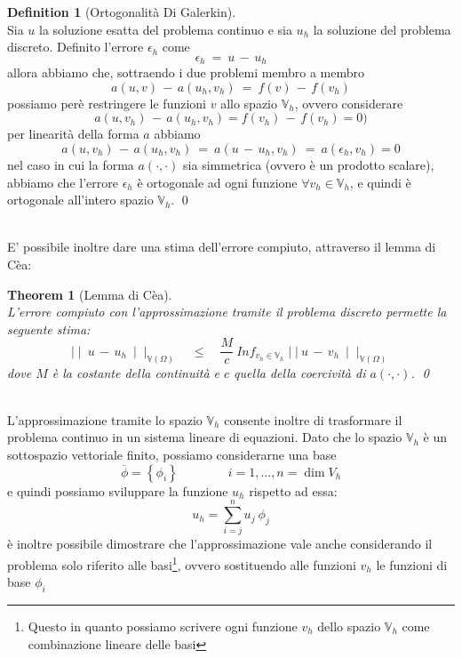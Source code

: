\documentclass[12pt,a4paper]{report}
\theoremstyle{theorem}
\newtheorem{theorem}{Theorem}[section]
\theoremstyle{definition}
\newtheorem{definition}{Definition}[section]
\begin{document}
\begin{definition} [Ortogonalità Di Galerkin]  \label{Galerkin Orthogonality}
\hfill \\
Sia $u$ la soluzione esatta del problema continuo e sia $u_{h}$ la soluzione del problema discreto. Definito l'errore $\epsilon_{h}$ come
\[ \epsilon_{h} \ = \ u \, - \, u_{h} \]
allora abbiamo che, sottraendo i due problemi membro a membro
\[ a(u,v) \, - \, a(u_{h}, v_{h}) \ =  \ f(v) \, - \, f(v_{h}) \]
possiamo perè restringere le funzioni $v$ allo spazio $\mathbb{V}_h$, ovvero considerare
\[ a(u,v_{h}) \, - \, a(u_{h}, v_{h}) = f(v_{h}) \, - \, f(v_{h}) = 0) \]
per linearità della forma $a$ abbiamo
\[ a(u,v_{h}) \, - \, a(u_{h}, v_{h}) \ =  \ a(u \, - \, u_{h}, v_{h}) \ =  \ a(\epsilon_{h},v_{h}) = 0 \]
nel caso in cui la forma $a(\cdot,\cdot)$ sia simmetrica (ovvero è un prodotto scalare), abbiamo che l'errore $\epsilon_{h}$ è ortogonale ad ogni funzione $\forall v_{h} \in \mathbb{V}_{h}$, e quindi è ortogonale all'intero spazio $\mathbb{V}_{h}$.
\qed
\end{definition}
\hfill \\
E' possibile inoltre dare una stima dell'errore compiuto, attraverso il lemma di Cèa:
\begin{theorem} [Lemma di Cèa]  \label{Lemma Di Cea}
\hfill \\
L'errore compiuto con l'approssimazione tramite il problema discreto permette la seguente stima:
\[ \mid \mid \ u \, - \, u_{h} \ \mid \mid_{\mathbb{V}(\Omega)} \quad \leq \quad \frac{M}{c} \ Inf_{v_{h} \in \mathbb{V}_{h}} \mid \mid \ u \, - \, v_{h} \ \mid \mid_{\mathbb{V}(\Omega)} \]
dove $M$ è la costante della continuità e $c$ quella della coercività di $a(\cdot,\cdot)$.
\qed
\end{theorem}
\hfill \\
L'approssimazione tramite lo spazio $\mathbb{V}_{h}$ consente inoltre di trasformare il problema continuo in un sistema lineare di equazioni. Dato che lo spazio $\mathbb{V}_{h}$ è un sottospazio vettoriale finito, possiamo considerarne una base
\[ \overline{\phi} = \left \{ \phi_{i} \right \} \qquad \qquad i = 1,..., n = \dim{V_{h}} \]
e quindi possiamo sviluppare la funzione $u_{h}$ rispetto ad essa:
\[ u_{h} = \sum_{i = j}^{n} u_{j} \ \phi_{j} \]
è inoltre possibile dimostrare che l'approssimazione vale anche considerando il problema solo riferito alle basi\footnote{Questo in quanto possiamo scrivere ogni funzione $v_{h}$ dello spazio $\mathbb{V}_{h}$ come combinazione lineare delle basi}, ovvero sostituendo alle funzioni $v_{h}$ le funzioni di base $\phi_{i}$
\end{document}
